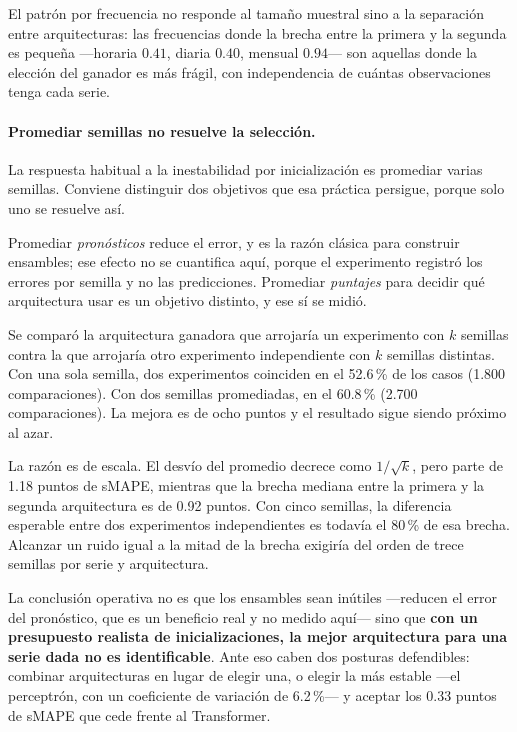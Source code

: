 El patrón por frecuencia no responde al tamaño muestral sino a la separación entre
arquitecturas: las frecuencias donde la brecha entre la primera y la segunda es
pequeña ---horaria $0.41$, diaria $0.40$, mensual $0.94$--- son aquellas donde la
elección del ganador es más frágil, con independencia de cuántas observaciones tenga
cada serie.

\paragraph{Promediar semillas no resuelve la selección.}\label{sec:ensamble}
La respuesta habitual a la inestabilidad por inicialización es promediar varias
semillas. Conviene distinguir dos objetivos que esa práctica persigue, porque solo uno
se resuelve así.

Promediar \emph{pronósticos} reduce el error, y es la razón clásica para construir
ensambles; ese efecto no se cuantifica aquí, porque el experimento registró los errores
por semilla y no las predicciones. Promediar \emph{puntajes} para decidir qué
arquitectura usar es un objetivo distinto, y ese sí se midió.

Se comparó la arquitectura ganadora que arrojaría un experimento con $k$ semillas contra
la que arrojaría otro experimento independiente con $k$ semillas distintas. Con una sola
semilla, dos experimentos coinciden en el 52.6\,\% de los casos (1.800 comparaciones).
Con dos semillas promediadas, en el 60.8\,\% (2.700 comparaciones). La mejora es de
ocho puntos y el resultado sigue siendo próximo al azar.

La razón es de escala. El desvío del promedio decrece como $1/\sqrt{k}$, pero parte de
1.18 puntos de sMAPE, mientras que la brecha mediana entre la primera y la segunda
arquitectura es de 0.92 puntos. Con cinco semillas, la diferencia esperable entre dos
experimentos independientes es todavía el 80\,\% de esa brecha. Alcanzar un ruido igual
a la mitad de la brecha exigiría del orden de trece semillas por serie y arquitectura.

La conclusión operativa no es que los ensambles sean inútiles ---reducen el error del
pronóstico, que es un beneficio real y no medido aquí--- sino que \textbf{con un
presupuesto realista de inicializaciones, la mejor arquitectura para una serie dada no
es identificable}. Ante eso caben dos posturas defendibles: combinar arquitecturas en
lugar de elegir una, o elegir la más estable ---el perceptrón, con un coeficiente de
variación de 6.2\,\%--- y aceptar los 0.33 puntos de sMAPE que cede frente al
Transformer.

